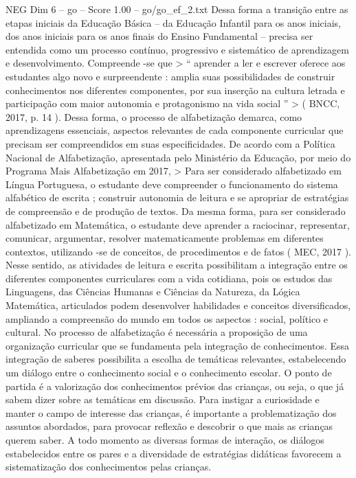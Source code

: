 \begin{textsample}{NEG Dim 6 – go – Score 1.00 – go/go\_ef\_2.txt}
Dessa forma a transição entre as etapas iniciais da Educação Básica – da Educação Infantil para os anos iniciais, dos anos iniciais para os anos finais do Ensino Fundamental – precisa ser entendida como um processo contínuo, progressivo e sistemático de aprendizagem e desenvolvimento.
Compreende -se que > “ aprender a ler e escrever oferece aos estudantes algo novo e surpreendente : amplia suas possibilidades de construir conhecimentos nos diferentes componentes, por sua inserção na cultura letrada e participação com maior autonomia e protagonismo na vida social ” > ( BNCC, 2017, p. 14 ).
Dessa forma, o processo de alfabetização demarca, como aprendizagens essenciais, aspectos relevantes de cada componente curricular que precisam ser compreendidos em suas especificidades.
De acordo com a Política Nacional de Alfabetização, apresentada pelo Ministério da Educação, por meio do Programa Mais Alfabetização em 2017, > Para ser considerado alfabetizado em Língua Portuguesa, o estudante deve compreender o funcionamento do sistema alfabético de escrita ; construir autonomia de leitura e se apropriar de estratégias de compreensão e de produção de textos.
Da mesma forma, para ser considerado alfabetizado em Matemática, o estudante deve aprender a raciocinar, representar, comunicar, argumentar, resolver matematicamente problemas em diferentes contextos, utilizando -se de conceitos, de procedimentos e de fatos ( MEC, 2017 ).
Nesse sentido, as atividades de leitura e escrita possibilitam a integração entre os diferentes componentes curriculares com a vida cotidiana, pois os estudos das Linguagens, das Ciências Humanas e Ciências da Natureza, da Lógica Matemática, articulados podem desenvolver habilidades e conceitos diversificados, ampliando a compreensão do mundo em todos os aspectos : social, político e cultural.
No processo de alfabetização é necessária a proposição de uma organização curricular que se fundamenta pela integração de conhecimentos.
Essa integração de saberes possibilita a escolha de temáticas relevantes, estabelecendo um diálogo entre o conhecimento social e o conhecimento escolar.
O ponto de partida é a valorização dos conhecimentos prévios das crianças, ou seja, o que já sabem dizer sobre as temáticas em discussão.
Para instigar a curiosidade e manter o campo de interesse das crianças, é importante a problematização dos assuntos abordados, para provocar reflexão e descobrir o que mais as crianças querem saber.
A todo momento as diversas formas de interação, os diálogos estabelecidos entre os pares e a diversidade de estratégias didáticas favorecem a sistematização dos conhecimentos pelas crianças.

\end{textsample}
